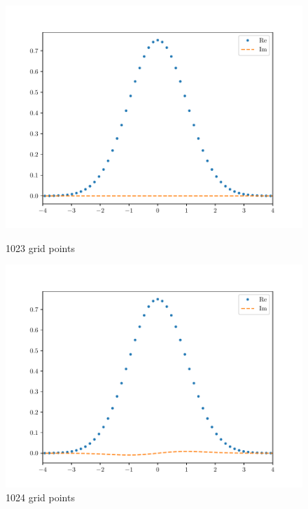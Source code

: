 \documentclass{article}
\begin{document}
\begin{enumerate}[1.]
\begin{enumerate}[(i)]
    \begin{figure}[H]
      \centering
      \begin{minipage}{0.3\linewidth}
        \centering
        \includegraphics[width=\linewidth]{q1-2-0.pdf}
        \caption*{1023 grid points}
      \end{minipage}
      \begin{minipage}{0.3\linewidth}
        \centering
        \includegraphics[width=\linewidth]{q1-2-1.pdf}
        \caption*{1024 grid points}
      \end{minipage}
      \begin{minipage}{0.3\linewidth}
        \centering

\end{minipage}
\end{figure}
\end{enumerate}
\end{enumerate}
\end{document}
